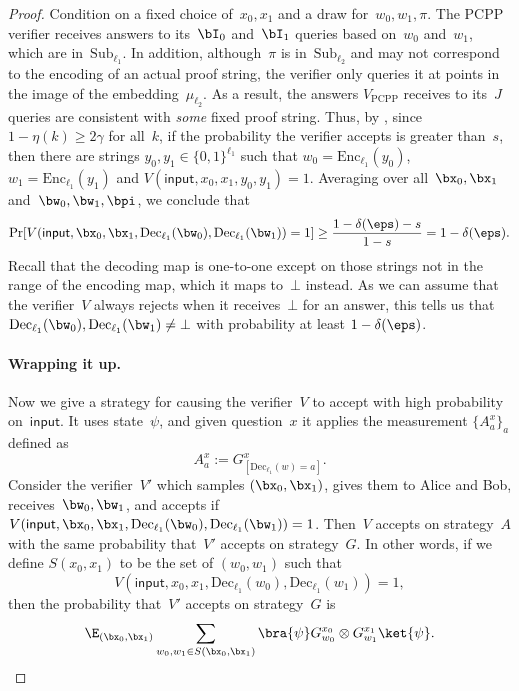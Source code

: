 \documentclass[11pt]{article}
\newcommand{\codee}{\mathrm{Enc}}
\newcommand{\coded}{\mathrm{Dec}}
\newcommand{\codes}{\mathrm{Sub}}
\begin{document}
\begin{proof}
Condition on a fixed choice of~$x_0, x_1$ and a draw for~$w_0, w_1, \pi$.
The PCPP verifier receives answers to its~$\bI_0$ and~$\bI_1$ queries based on~$w_0$ and~$w_1$, which are in~$\codes_{\ell_1}$.
In addition, although~$\pi$ is in~$\codes_{\ell_2}$ and may not correspond to the encoding of an actual proof string,
the verifier only queries it at points in the image of the embedding~$\mu_{\ell_2}$.
As a result, the answers $V_{\mathrm{PCPP}}$ receives to its~$J$ queries are consistent with \emph{some} fixed proof string.
Thus, by , since $1-\eta(k) \geq 2\gamma$ for all~$k$, if the probability
the verifier accepts is greater than~$s$, then there are strings $y_0, y_1 \in \{0, 1\}^{\ell_1}$
such that $w_0 = \codee_{\ell_1}(y_0)$, $w_1 = \codee_{\ell_1}(y_1)$
and $V(\mathsf{input}, x_0, x_1, y_0, y_1) = 1$.
Averaging over all~$\bx_0, \bx_1$ and~$\bw_0, \bw_1, \bpi$, we conclude that
\begin{equation}\label{eq:absolute-unit-of-a-strategy}
\Pr[V(\mathsf{input}, \bx_0, \bx_1, \coded_{\ell_1}(\bw_0), \coded_{\ell_1}(\bw_1)) = 1] \geq \frac{1-\delta(\eps)-s}{1-s} = 1-\delta(\eps).
\end{equation}
Recall that the decoding map is one-to-one except on those strings not in the range of the encoding map, which it maps to~$\bot$ instead.
As we can assume that the verifier~$V$ always rejects when it receives~$\bot$ for an answer,
this tells us that $\coded_{\ell_1}(\bw_0), \coded_{\ell_1}(\bw_1) \neq \bot$ with probability at least $1-\delta(\eps)$.

\paragraph{Wrapping it up.}
Now we give a strategy for causing the verifier~$V$ to accept with high probability on~$\mathsf{input}$.
It uses state~$\psi$, and given question~$x$ it applies the measurement $\{A^x_a\}_a$ defined as
\begin{equation*}
A^x_a := G^x_{[\coded_{\ell_1}(w) = a]}.
\end{equation*}
Consider the verifier~$V'$ which samples $(\bx_0, \bx_1)$, gives them to Alice and Bob, receives~$\bw_0, \bw_1$,
and accepts if $V(\mathsf{input}, \bx_0, \bx_1, \coded_{\ell_1}(\bw_0), \coded_{\ell_1}(\bw_1)) = 1$.
Then~$V$ accepts on strategy~$A$ with the same probability that~$V'$ accepts on strategy~$G$.
In other words, if we define $S(x_0, x_1)$ to be the set of $(w_0, w_1)$
such that
\begin{equation*}
V(\mathsf{input}, x_0, x_1, \coded_{\ell_1}(w_0), \coded_{\ell_1}(w_1))=1,
\end{equation*}
then the probability that~$V'$ accepts on strategy~$G$ is
\begin{equation}\label{eq:its-the-final-countdown}
\E_{(\bx_0, \bx_1)} \sum_{w_0, w_1 \in S(\bx_0, \bx_1)} \bra{\psi} G^{x_0}_{w_0} \otimes G^{x_1}_{w_1}\ket{\psi}.
\end{equation}


\end{proof}
\end{document}
